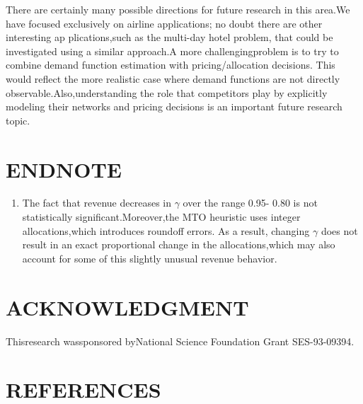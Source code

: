 There are certainly many possible directions for future research in this
area.We have focused exclusively on airline applications; no doubt there
are other interesting ap plications,such as the multi-day hotel problem,
that could be investigated using a similar approach.A more
challengingproblem is to try to combine demand function estimation with
pricing/allocation decisions. This would reflect the more realistic case
where demand functions are not directly observable.Also,understanding
the role that competitors play by explicitly modeling their networks and
pricing decisions is an important future research topic.

\section{ENDNOTE}\label{endnote}

\begin{enumerate}
\def\labelenumi{\arabic{enumi}.}
\tightlist
\item
  The fact that revenue decreases in \(\gamma\) over the range 0.95-
  0.80 is not statistically significant.Moreover,the MTO heuristic uses
  integer allocations,which introduces roundoff errors. As a result,
  changing \(\gamma\) does not result in an exact proportional change in
  the allocations,which may also account for some of this slightly
  unusual revenue behavior.
\end{enumerate}

\section{ACKNOWLEDGMENT}\label{acknowledgment}

Thisresearch wassponsored byNational Science Foundation Grant
SES-93-09394.

\section{REFERENCES}\label{references}

